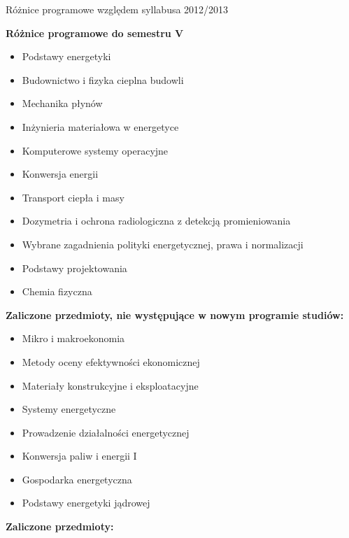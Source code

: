 \documentclass[a4paper,12pt]{article}
\begin{document}
\begin{center}
\Large{Różnice programowe względem syllabusa 2012/2013}
\end{center}
\vspace{20pt}
\textbf{Różnice programowe do semestru V}
\begin{itemize}
\item Podstawy energetyki
\item Budownictwo i fizyka cieplna budowli
\item Mechanika płynów
\item Inżynieria materiałowa w energetyce
\item Komputerowe systemy operacyjne
\item Konwersja energii
\item Transport ciepła i masy
\item Dozymetria i ochrona radiologiczna z detekcją promieniowania
\item Wybrane zagadnienia polityki energetycznej, prawa i normalizacji
\item Podstawy projektowania
\item Chemia fizyczna
\end{itemize}
\vspace{20pt}
\textbf{Zaliczone przedmioty, nie występujące w nowym programie studiów:}
\begin{itemize}
\item Mikro i makroekonomia
\item Metody oceny efektywności ekonomicznej
\item Materiały konstrukcyjne i eksploatacyjne
\item Systemy energetyczne
\item Prowadzenie działalności energetycznej
\item Konwersja paliw i energii I
\item Gospodarka energetyczna
\item Podstawy energetyki jądrowej
\end{itemize}
\newpage
\textbf{Zaliczone przedmioty:}
\end{document}
